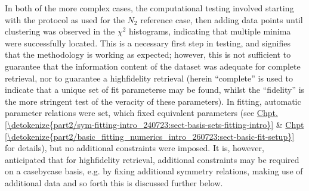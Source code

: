 \documentclass[letterpaper,table,10pt,english]{jupyterBook}
\begin{document}
\sphinxAtStartPar
In both of the more complex cases, the computational testing involved starting with the protocol as used for the \(N_2\) reference case, then adding data points until clustering was observed in the \(\chi^2\) histograms, indicating that multiple minima were successfully located. This is a necessary first step in testing, and signifies that the methodology is working as expected; however, this is not sufficient to guarantee that the information content of the dataset was adequate for complete {\hyperref[\detokenize{backmatter/glossary:term-radial-matrix-elements}]{}} retrieval, nor to guarantee a high\sphinxhyphen{}fidelity retrieval (herein “complete” is used to indicate that a unique set of fit parameterse may be found, whilst the “fidelity” is the more stringent test of the veracity of these parameters). In fitting, automatic parameter relations were set, which fixed equivalent parameters (see \hyperref[\detokenize{part2/sym-fitting-intro_240723:sect-basis-sets-fitting-intro}]{Chpt.\@ \ref{\detokenize{part2/sym-fitting-intro_240723:sect-basis-sets-fitting-intro}}} \& \hyperref[\detokenize{part2/basic_fitting_numerics_intro_260723:sect-basic-fit-setup}]{Chpt \ref{\detokenize{part2/basic_fitting_numerics_intro_260723:sect-basic-fit-setup}}} for details), but no additional constraints were imposed. It is, however, anticipated that for high\sphinxhyphen{}fidelity retrieval, additional constraints may be required on a case\sphinxhyphen{}by\sphinxhyphen{}case basis, e.g. by fixing additional symmetry relations, making use of additional data and so forth \sphinxhyphen{} this is discussed further below.
\end{document}
